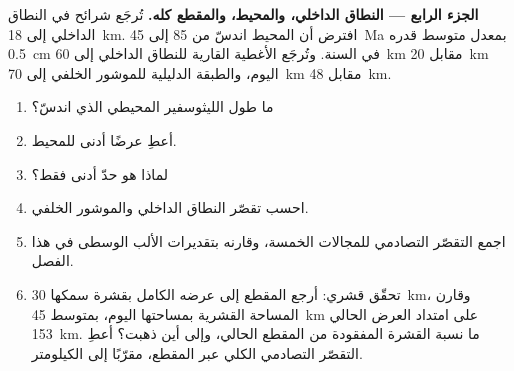 \begin{problem}
\noindent\textbf{الجزء الرابع --- النطاق الداخلي، والمحيط، والمقطع كله.}
تُرجَع شرائح  في النطاق الداخلي إلى \qty{18}{km}. افترض أن المحيط
اندسّ من 85 إلى \qty{45}{Ma} بمعدل متوسط قدره \qty{0.5}{cm} في السنة. وتُرجَع الأغطية
القارية للنطاق الداخلي إلى \qty{60}{km} مقابل \qty{20}{km} اليوم،
والطبقة الدليلية للموشور الخلفي إلى \qty{70}{km} مقابل \qty{48}{km}.
\begin{enumerate}[resume]
\item ما طول الليثوسفير المحيطي الذي اندسّ؟
\item أعطِ عرضًا أدنى للمحيط.
\item لماذا هو حدّ أدنى فقط؟
\item احسب تقصّر النطاق الداخلي والموشور الخلفي.
\item اجمع التقصّر التصادمي للمجالات الخمسة، وقارنه
بتقديرات الألب الوسطى في هذا الفصل.
\item تحقّق قشري: أرجع المقطع إلى عرضه الكامل بقشرة سمكها \qty{30}{km}،
وقارن المساحة القشرية بمساحتها اليوم، بمتوسط \qty{45}{km} على امتداد العرض الحالي
\qty{153}{km}. ما نسبة القشرة المفقودة من المقطع الحالي، وإلى أين
ذهبت؟ أعطِ التقصّر التصادمي الكلي عبر المقطع، مقرّبًا إلى
الكيلومتر.
\end{enumerate}
\end{problem}
